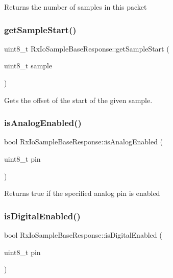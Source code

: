 Returns the number of samples in this packet \hypertarget{class_rx_io_sample_base_response_a303145668b9624e07868d0a1a835c4b4}{}\label{class_rx_io_sample_base_response_a303145668b9624e07868d0a1a835c4b4} 
\subsubsection{\texorpdfstring{get\+Sample\+Start()}{getSampleStart()}}
{\footnotesize\ttfamily uint8\+\_\+t Rx\+Io\+Sample\+Base\+Response\+::get\+Sample\+Start (\begin{DoxyParamCaption}\item[{uint8\+\_\+t}]{sample }\end{DoxyParamCaption})}

Gets the offset of the start of the given sample. \hypertarget{class_rx_io_sample_base_response_ad8fc07932c2e011b83814082b1d82400}{}\label{class_rx_io_sample_base_response_ad8fc07932c2e011b83814082b1d82400} 
\subsubsection{\texorpdfstring{is\+Analog\+Enabled()}{isAnalogEnabled()}}
{\footnotesize\ttfamily bool Rx\+Io\+Sample\+Base\+Response\+::is\+Analog\+Enabled (\begin{DoxyParamCaption}\item[{uint8\+\_\+t}]{pin }\end{DoxyParamCaption})}

Returns true if the specified analog pin is enabled \hypertarget{class_rx_io_sample_base_response_aa897267985b5b8c02abd68b50f954de7}{}\label{class_rx_io_sample_base_response_aa897267985b5b8c02abd68b50f954de7} 
\subsubsection{\texorpdfstring{is\+Digital\+Enabled()}{isDigitalEnabled()}}
{\footnotesize\ttfamily bool Rx\+Io\+Sample\+Base\+Response\+::is\+Digital\+Enabled (\begin{DoxyParamCaption}\item[{uint8\+\_\+t}]{pin }\end{DoxyParamCaption})}

